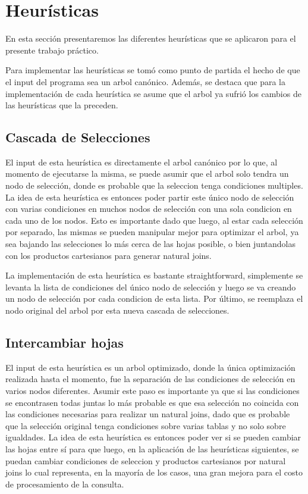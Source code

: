 \documentclass[a4paper,11pt]{article}
\begin{document}



\tableofcontents

\newpage


\section{Heurísticas}

En esta sección presentaremos las diferentes heurísticas que se aplicaron para el presente trabajo práctico. 

Para implementar las heurísticas se tomó como punto de partida el hecho de que el input del programa sea un arbol canónico. Además, se destaca que para la implementación de cada heurística se asume que el arbol ya sufrió los cambios de las heurísticas que la preceden.

\subsection{Cascada de Selecciones}

El input de esta heurística es directamente el arbol canónico por lo que, al momento de ejecutarse la misma, se puede asumir que el arbol solo tendra un nodo de selección, donde es probable que la seleccion tenga condiciones multiples. La idea de esta heurística es entonces
poder partir este único nodo de selección con varias condiciones en muchos nodos de selección con una sola condicion en cada uno de los nodos. Esto es importante dado que luego, al estar cada selección por separado, las mismas se pueden manipular mejor para optimizar el arbol, ya sea bajando las selecciones lo
más cerca de las hojas posible, o bien juntandolas con los productos cartesianos para generar natural joins.

La implementación de esta heurística es bastante straightforward, simplemente se levanta la lista de condiciones del único nodo de selección y luego se va creando un nodo de selección por cada condicion de esta lista. Por último, se reemplaza el nodo original del arbol por esta nueva cascada de selecciones.


\subsection{Intercambiar hojas}

El input de esta heurística es un arbol optimizado, donde la única optimización realizada hasta el momento, fue la separación de las condiciones de selección en varios nodos diferentes. Asumir este paso es importante ya que si las condiciones se encontrasen todas juntas lo más probable es que esa selección no coincida con las condiciones necesarias para realizar un natural joins, dado que es probable que la selección original tenga condiciones sobre varias tablas y no solo sobre igualdades. La idea de esta heurística es entonces poder ver si se pueden cambiar las hojas entre sí para que luego, en la aplicación de las heurísticas siguientes, se puedan cambiar condiciones de seleccion y productos cartesianos por natural joins lo cual representa, en la mayoría de los casos, una gran mejora para el costo de procesamiento de la consulta.
\end{document}
